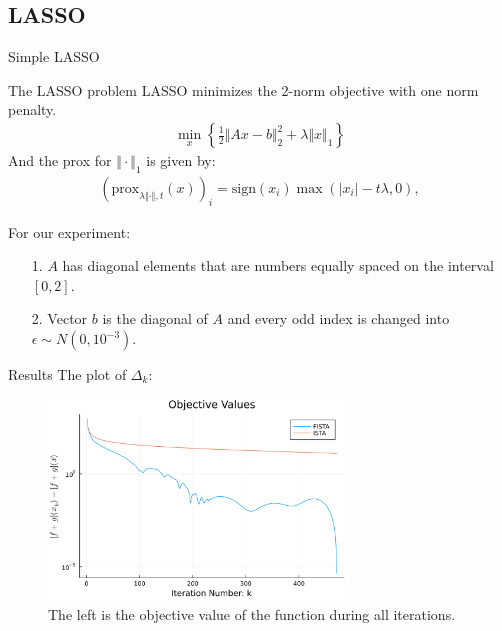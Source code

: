 \documentclass[11pt]{beamer}
\begin{document}
    \subsection{LASSO}
        \begin{frame}{Simple LASSO}
            \begin{block}{The LASSO problem}
                LASSO minimizes the 2-norm objective with one norm penalty. 
                \begin{align*}
                    \min_{x}\left\lbrace
                        \frac{1}{2}\Vert Ax - b\Vert^2_2 + \lambda\Vert x\Vert_1    
                    \right\rbrace
                \end{align*}
                And the prox for $\Vert \cdot\Vert_1$ is given by: 
                \begin{align*}
                    (\text{prox}_{\lambda\Vert \cdot \Vert, t}(x))_i
                    = 
                    \text{sign}(x_i)\max(|x_i| - t\lambda, 0), 
                \end{align*}
            \end{block}
            For our experiment: 
            \begin{itemize}
                \item [1.] $A$ has diagonal elements that are numbers equally spaced on the interval $[0, 2]$. 
                \item [2.] Vector $b$ is the diagonal of $A$ and every odd index is changed into $\epsilon \sim  N(0, 10^{-3})$. 
            \end{itemize}
        \end{frame}
        \begin{frame}{Results}
            The plot of $\Delta_k$: 
            \begin{figure}[h]
                \centering
                \includegraphics[width=8cm]{simple_lass_obj.png}
                \caption{The left is the objective value of the function during all iterations.}
            \end{figure}
        \end{frame}
\end{document}
